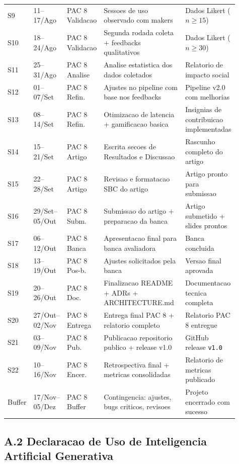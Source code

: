 \documentclass[portuguese]{sbcreviews-2025}%
\begin{document}
\begin{longtable}{%
p{0.06\linewidth}
p{0.13\linewidth}
p{0.14\linewidth}
p{0.36\linewidth}
p{0.22\linewidth}
}
S9 & 11--17/Ago & PAC 8 Validacao & Sessoes de uso observado com makers & Dados Likert ($n \geq 15$) \\
S10 & 18--24/Ago & PAC 8 Validacao & Segunda rodada coleta + feedbacks qualitativos & Dados Likert ($n \geq 30$) \\
S11 & 25--31/Ago & PAC 8 Analise & Analise estatistica dos dados coletados & Relatorio de impacto social \\
S12 & 01--07/Set & PAC 8 Refin. & Ajustes no pipeline com base nos feedbacks & Pipeline v2.0 com melhorias \\
S13 & 08--14/Set & PAC 8 Refin. & Otimizacao de latencia + gamificacao basica & Insignias de contribuicao implementadas \\
S14 & 15--21/Set & PAC 8 Artigo & Escrita secoes de Resultados e Discussao & Rascunho completo do artigo \\
S15 & 22--28/Set & PAC 8 Artigo & Revisao e formatacao SBC do artigo & Artigo pronto para submissao \\
S16 & 29/Set--05/Out & PAC 8 Subm. & Submissao do artigo + preparacao da banca & Artigo submetido + slides prontos \\
S17 & 06--12/Out & PAC 8 Banca & Apresentacao final para banca avaliadora & Banca concluida \\
S18 & 13--19/Out & PAC 8 Pos-b. & Ajustes solicitados pela banca & Versao final aprovada \\
S19 & 20--26/Out & PAC 8 Doc. & Finalizacao README + ADRs + ARCHITECTURE.md & Documentacao tecnica completa \\
S20 & 27/Out--02/Nov & PAC 8 Entrega & Entrega final PAC 8 + relatorio completo & Relatorio PAC 8 entregue \\
S21 & 03--09/Nov & PAC 8 Pub. & Publicacao repositorio publico + release v1.0 & GitHub release \texttt{v1.0} \\
S22 & 10--16/Nov & PAC 8 Encer. & Retrospectiva final + metricas consolidadas & Relatorio de metricas publicado \\
Buffer & 17/Nov--05/Dez & PAC 8 Buffer & Contingencia: ajustes, bugs criticos, revisoes & Projeto encerrado com sucesso \\
\end{longtable}

\subsection*{A.2 Declaracao de Uso de Inteligencia Artificial Generativa}
\end{document}
